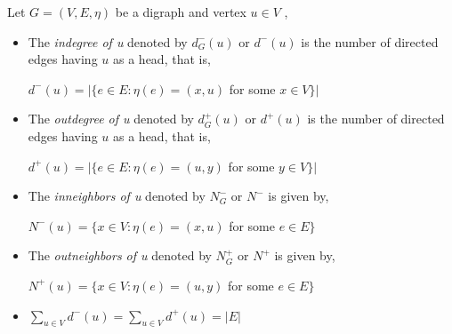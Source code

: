 Let $G=(V,E,\eta)$ be a digraph and vertex $u \in V$ ,
\begin{itemize}
	\item The \textit{indegree of u} denoted by $d_G^-(u)$ or $d^-(u)$ is the number of directed edges having $u$ as a head, that is,\\
	\begin{center}
	$d^-(u)=|\{e \in E: \eta(e)=(x,u)$ for some $ x \in V\}|$
	\end{center}
	
	\item The \textit{outdegree of u} denoted by $d_G^+(u)$ or $d^+(u)$ is the number of directed edges having $u$ as a head, that is,\\
	\begin{center}
	$d^+(u)=|\{e \in E: \eta(e)=(u,y)$ for some $ y \in V\}|$
	\end{center}
	\item The \textit{inneighbors of u} denoted by $N_G^-$ or $N^-$ is given by,
	\begin{center}
	$N^-(u)=\{x \in V: \eta(e)=(x,u)$ for some $ e \in E\}$
	\end{center}
	\item The \textit{outneighbors of u} denoted by $N_G^+$ or $N^+$ is given by,
	\begin{center}
	$N^+(u)=\{x \in V: \eta(e)=(u,y)$ for some $ e \in E\}$
	\end{center}
	\item 
	\begin{center}
		$\sum\limits_{u\in V} d^-(u) = \sum\limits_{u\in V} d^+(u)=|E|$
	\end{center}
\end{itemize}

